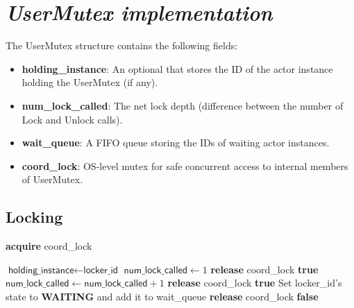 \chapter{\textit{UserMutex implementation}} \label{appendix:user_mutex_implementation}
The \textsf{UserMutex} structure contains the following fields:
\begin{itemize}
  \item \textbf{\textsf{holding\_instance}}: An optional that stores the ID of the actor instance holding the \textsf{UserMutex} (if any).
  \item \textbf{\textsf{num\_lock\_called}}: The net lock depth (difference between the number of \textsf{Lock} and \textsf{Unlock} calls).
  \item \textbf{\textsf{wait\_queue}}: A FIFO queue storing the IDs of waiting actor instances.
  \item \textbf{\textsf{coord\_lock}}: OS-level mutex for safe concurrent access to internal members of \textsf{UserMutex}.
\end{itemize} 
\section{Locking}
\begin{algorithmic}[1]
    \State \textbf{acquire} \textsf{coord\_lock}
    
        \State $\textsf{holding\_instance} \gets \textsf{locker\_id}$
        \State $\textsf{num\_lock\_called} \gets 1$
        \State \textbf{release} \textsf{coord\_lock}
        \State \Return \textbf{true}
        \State $\textsf{num\_lock\_called} \gets \textsf{num\_lock\_called} + 1$
        \State \textbf{release} \textsf{coord\_lock}
        \State \Return \textbf{true}
    \Else
        \State Set \textsf{locker\_id}'s state to \textbf{WAITING} and add it to \textsf{wait\_queue}
        \State \textbf{release} \textsf{coord\_lock}
        \State \Return \textbf{false}
    \EndIf
\EndProcedure
\end{algorithmic}

